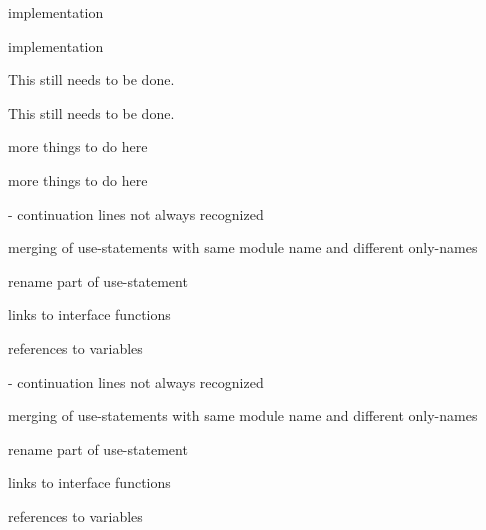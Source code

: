 
\begin{DoxyRefList}
\item[Member \mbox{\hyperlink{build_2doxygen_2src_2fortrancode_8l_a10846e97a3fc0d686cf52e8d554e1c6a}{get\+Generic\+Procedure\+Link}} (yyscan\+\_\+t yyscanner, const \mbox{\hyperlink{class_class_def}{Class\+Def}} $\ast$cd, const \mbox{\hyperlink{class_q_c_string}{QCString}} \&member\+Text, \mbox{\hyperlink{class_code_output_interface}{Code\+Output\+Interface}} \&ol)]\label{todo__todo000002}%
%
implementation 

\label{todo__todo000006}%
%
implementation  
\item[\mbox{\hyperlink{class_class}{Class}} \mbox{\hyperlink{class_todo}{Todo}} ]\label{todo__todo000003}%
%
This still needs to be done. 

\label{todo__todo000007}%
%
This still needs to be done.  
\item[Member \mbox{\hyperlink{class_todo_a9e70ec9176ac4c1b20e011b4daddc9d8}{Todo\+::todo}} ()]\label{todo__todo000008}%
%
more things to do here 

\label{todo__todo000004}%
%
more things to do here  
\item[Member \mbox{\hyperlink{build_2doxygen_2src_2fortrancode_8l_a5d5508008cac8fb66fca3baa4e9b6584}{YY\+\_\+\+TYPEDEF\+\_\+\+YY\+\_\+\+SCANNER\+\_\+T}} ]\label{todo__todo000001}%
%
-\/ continuation lines not always recognized
\begin{DoxyItemize}
\item merging of use-\/statements with same module name and different only-\/names
\item rename part of use-\/statement
\item links to interface functions
\item references to variables 
\end{DoxyItemize}

\label{todo__todo000005}%
%
-\/ continuation lines not always recognized
\begin{DoxyItemize}
\item merging of use-\/statements with same module name and different only-\/names
\item rename part of use-\/statement
\item links to interface functions
\item references to variables 
\end{DoxyItemize}
\end{DoxyRefList}